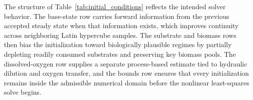 \documentclass[a4paper,fleqn]{cas-sc}
\newenvironment{revblock}{}{}
\newenvironment{revblockr116}{}{}
\newenvironment{revblockr22}{}{}
\begin{document}
\begin{revblock}
\begin{revblockr116}
\begin{table}[H]
\centering
\caption{Initialization heuristics used for the steady-state nonlinear solve.}
\label{tab:initial_conditions}
\scriptsize
{}
\end{table}

The structure of Table~\ref{tab:initial_conditions} reflects the intended solver behavior. The base-state row carries forward information from the previous accepted steady state when that information exists, which improves continuity across neighboring Latin hypercube samples. The substrate and biomass rows then bias the initialization toward biologically plausible regimes by partially depleting readily consumed substrates and preserving key biomass pools. The dissolved-oxygen row supplies a separate process-based estimate tied to hydraulic dilution and oxygen transfer, and the bounds row ensures that every initialization remains inside the admissible numerical domain before the nonlinear least-squares solve begins.
\end{revblockr116}

\begin{revblockr22}

\end{revblockr22}
\end{revblock}
\end{document}
